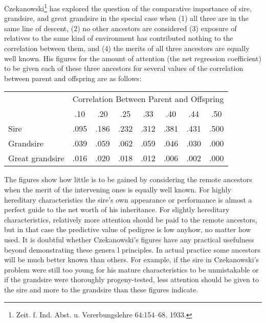 Czekanowski\footnote{Zeit. f. Ind. Abst. u. Vererbungslehre 64:154--68. 1933.}
has explored the question of the comparative importance
of sire, grandsire, and great grandsire in the special case when (1)
all three are in the same line of descent, (2) no other ancestors are considered
(3) exposure of relatives to the same kind of environment has
contributed nothing to the correlation between them, and (4) the merits
of all three ancestors are equally well known. His figures for the
amount of attention (the net regression coefficient) to be given each of
these three ancestors for several values of the correlation between parent
and offspring are as follows:

\begin{table}[htbp]
	\centering
	\begin{tabular}{l|c|c|c|c|c|c|c}
		\hline
		\hline
		 				& \multicolumn{7}{c}{Correlation Between Parent and Offspring} \\
		 				\cline{2-8}
		 				& .10 &	.20 &	.25	& .33	& .40	& .44	& .50 \\
		\hline
		Sire			& .095	& .186	& .232	& .312	& .381	& .431	& .500 \\
		Grandsire		& .039	& .059	& .062	& .059	& .046	& .030	& .000 \\
		Great grandsire	& .016	& .020	& .018	& .012	& .006	& .002	& .000 \\
		\hline
	\end{tabular}
\end{table}

\noindent
The figures show how little is to be gained by considering the remote
ancestors when the merit of the intervening ones is equally well known.
For highly hereditary characteristics the sire's own appearance or performance
is almost a perfect guide to the net worth of his inheritance.
For slightly hereditary characteristics, relatively more attention should
be paid to the remote ancestors, but in that case the predictive value of
pedigree is low anyhow, no matter how used. It is doubtful whether
Czekanowski's figures have any practical usefulness beyond demonstrating
these genera l principles. In actual practice some ancestors will
be much better known than others. For example, if the sire in Czekanowski's
problem were still too young for his mature characteristics to
be unmistakable or if the grandsire were thoroughly progeny-tested,
less attention should be given to the sire and more to the grandsire than
these figures indicate.

